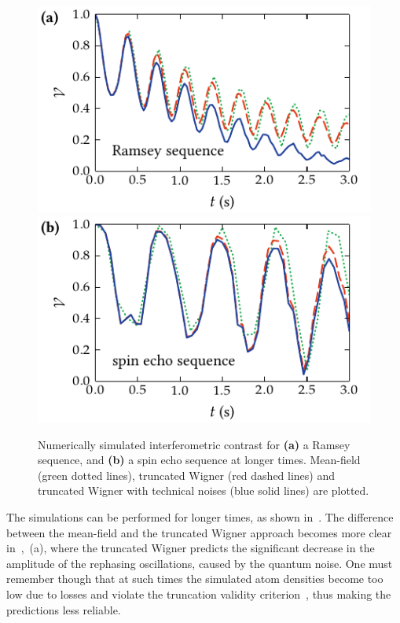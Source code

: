 \begin{figure}
    \centerline{%
    \includegraphics{figures_generated/bec_noise/ramsey_visibility_long.pdf}%
    \includegraphics{figures_generated/bec_noise/echo_visibility_long.pdf}}

    \caption[Experimental and numerically simulated interferometric constrast in Ramsey and spin echo sequences for longer times]{Numerically simulated interferometric contrast for \textbf{(a)} a Ramsey sequence, and \textbf{(b)} a spin echo sequence at longer times.
    Mean-field (green dotted lines), truncated Wigner (red dashed lines) and truncated Wigner with technical noises (blue solid lines) are plotted.}%

    \label{fig:bec-noise:visibility:visibility-long}
\end{figure}

The simulations can be performed for longer times, as shown in~.
The difference between the mean-field and the truncated Wigner approach becomes more clear in~,~(a), where the truncated Wigner predicts the significant decrease in the amplitude of the rephasing oscillations, caused by the quantum noise.
One must remember though that at such times the simulated atom densities become too low due to losses and violate the truncation validity criterion~, thus making the predictions less reliable.

